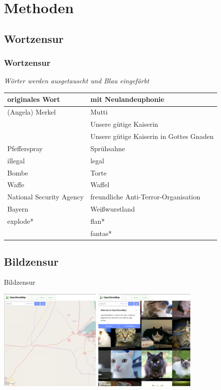 \documentclass [xcolor=dvipsnames] {beamer}
\begin{document}
\section{Methoden}
\subsection{Wortzensur}
\begin{frame}
	\frametitle{\sc Wortzensur}
	\begin{center}
		{\it Wörter werden ausgetauscht und Blau eingefärbt}
		\ \\
	\end{center}
	\begin{tabular}{l|l}
		originales Wort & mit Neulandeuphonie\\
		\hline
		(Angela) Merkel & Mutti\\
		& Unsere gütige Kaiserin\\
		& Unsere gütige Kaiserin in Gottes Gnaden\\
		Pfefferspray & Sprühsahne\\
		illegal & legal\\
		Bombe & Torte\\
		Waffe & Waffel\\
		National Security Agency & freundliche Anti-Terror-Organisation\\
		Bayern & Weißwurstland\\
		explode* & flan*\\
		& fantas*
	\end{tabular}
\end{frame}

\subsection{Bildzensur}
\begin{frame}
	{\sc Bildzensur}
	\begin{center}
		\includegraphics[width=5cm]{osm-1}
		\hspace*{.5cm}
		\includegraphics[width=5cm]{osm-mod-1}
	\end{center}
\end{frame}
\end{document}

